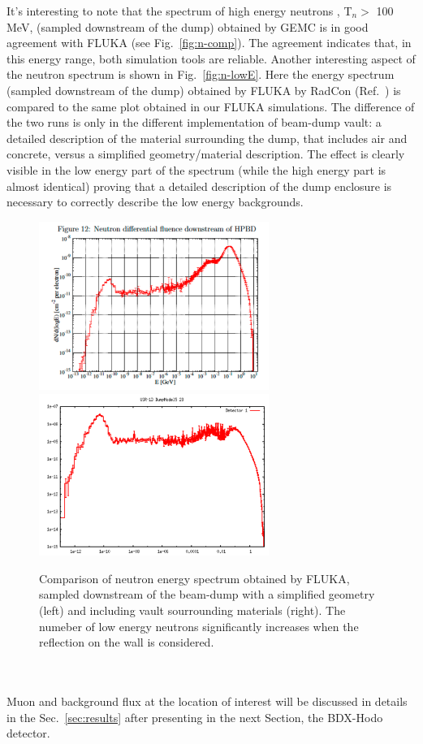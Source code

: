 It's interesting to note that the spectrum of  high energy neutrons , T$_n>$ 100 MeV,  (sampled downstream of the dump)  obtained by GEMC is in good agreement with FLUKA (see Fig.~\ref{fig:n-comp}). The agreement indicates  that, in this energy range, both simulation tools are reliable. 
Another interesting aspect of the neutron spectrum is shown in Fig.~\ref{fig:n-lowE}. Here the energy spectrum (sampled downstream of the dump) obtained by FLUKA by RadCon (Ref.~\cite{jnote-bd}) is compared to the same plot obtained in our FLUKA simulations. The difference of the two runs is only in the different implementation of  beam-dump vault: a detailed description of the material surrounding the dump,  that includes air and concrete,  versus a simplified geometry/material description.   The effect is clearly visible in the low energy part of the spectrum (while the high energy part is almost identical) proving that a detailed description of the dump enclosure is necessary to correctly describe the low energy backgrounds.
\begin{figure}[h!] 
\center
\includegraphics[width=7.5cm]{figs/bg-lowN-george.pdf}    
\includegraphics[width=7.5cm]{figs/NeutronsDumpComparisonDnDlogE_1D.pdf}   
\caption{Comparison of neutron energy spectrum obtained by FLUKA, sampled downstream of the beam-dump with a simplified geometry (left) and including vault sourrounding materials (right). The numeber of low energy neutrons significantly increases when the reflection on the wall is considered.}
\label{fig:bg-lowE}
\end{figure}
\\ \\ 
Muon and background flux  at  the location of interest will be discussed in details in the Sec.~\ref{sec:results} after presenting in the next Section,  the BDX-Hodo detector. 



